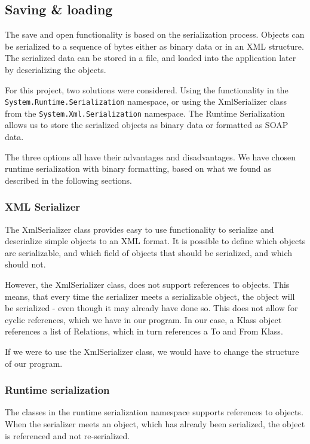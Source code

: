 \subsection{Saving \& loading}
The save and open functionality is based on the serialization process. Objects can be serialized to a sequence of bytes either as binary data or in an XML structure. The serialized data can be stored in a file, and loaded into the application later by deserializing the objects.

For this project, two solutions were considered. Using the functionality in the \texttt{System.Runtime.Serialization} namespace, or using the XmlSerializer class from the \texttt{System.Xml.Serialization} namespace. The Runtime Serialization allows us to store the serialized objects as binary data or formatted as SOAP data.

The three options all have their advantages and disadvantages. We have chosen runtime serialization with binary formatting, based on what we found as described in the following sections.

\subsubsection{XML Serializer}
The XmlSerializer class provides easy to use functionality to serialize and deserialize simple objects to an XML format. It is possible to define which objects are serializable, and which field of objects that should be serialized, and which should not.

However, the XmlSerializer class, does not support references to objects. This means, that every time the serializer meets a serializable object, the object will be serialized - even though it may already have done so. This does not allow for cyclic references, which we have in our program. In our case, a Klass object references a list of Relations, which in turn references a To and From Klass.

If we were to use the XmlSerializer class, we would have to change the structure of our program.

\subsubsection{Runtime serialization}
The classes in the runtime serialization namespace supports references to objects. When the serializer meets an object, which has already been serialized, the object is referenced and not re-serialized.

